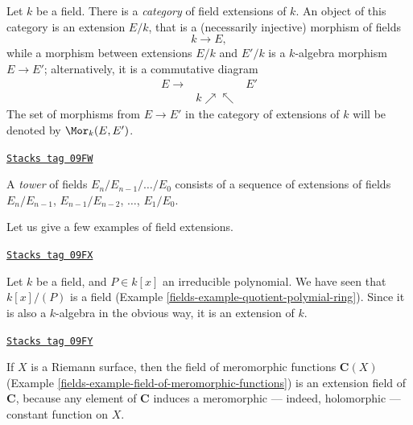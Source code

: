 \medskip\noindent
Let $k$ be a field. There is a {\it category} of field extensions of $k$.
An object of this category is an extension $E/k$, that is a
(necessarily injective) morphism of fields
$$
k \to E,
$$
while a morphism between extensions $E/k$ and $E'/k$ is a $k$-algebra
morphism $E \to E'$; alternatively, it is a commutative diagram
$$
\begin{array}{ccc}E \longrightarrow &  & E' \\  & k \nearrow\nwarrow & \end{array}
$$
The set of morphisms from $E \to E'$ in the category of extensions of $k$
will be denoted by $\Mor_k(E, E')$.

\begin{definition}[Tower]
\label{fields-definition-tower}
\href{https://stacks.math.columbia.edu/tag/09FW}{\texttt{Stacks tag 09FW}}

A {\it tower} of fields $E_n/E_{n - 1}/\ldots/E_0$ consists of a sequence of
extensions of fields
$E_n/E_{n - 1}$, $E_{n - 1}/E_{n - 2}$, $\ldots$, $E_1/E_0$.
\end{definition}

Let us give a few examples of field extensions.

\begin{example}
\label{fields-example-monogenic-extension}
\href{https://stacks.math.columbia.edu/tag/09FX}{\texttt{Stacks tag 09FX}}

Let $k$ be a field, and $P \in k[x]$ an irreducible polynomial. We have
seen that $k[x]/(P)$ is a field (Example \ref{fields-example-quotient-polymial-ring}).
Since it is also a $k$-algebra in the obvious way, it is an extension of $k$.
\end{example}

\begin{example}
\label{fields-example-field-of-meromorphic-functions-extension-C}
\href{https://stacks.math.columbia.edu/tag/09FY}{\texttt{Stacks tag 09FY}}

If $X$ is a Riemann surface, then the field of meromorphic functions
$\mathbf{C}(X)$ (Example \ref{fields-example-field-of-meromorphic-functions})
is an extension field of $\mathbf{C}$, because any element of $\mathbf{C}$
induces a meromorphic --- indeed, holomorphic --- constant function on $X$.
\end{example}

